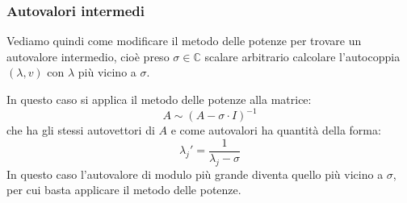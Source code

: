 \documentclass[a4paper,11pt]{article}
\begin{document}
\subsubsection{Autovalori intermedi}
Vediamo quindi come modificare il metodo delle potenze per trovare un autovalore intermedio, cioè preso $\sigma \in \mathbb{C}$ scalare arbitrario calcolare l'autocoppia $(\lambda, v)$ con $\lambda$ più vicino a $\sigma$.

In questo caso si applica il metodo delle potenze alla matrice:
$$
A \sim (A - \sigma \cdot I)^{-1}
$$
che ha gli stessi autovettori di $A$ e come autovalori ha quantità della forma:
$$
\lambda_j' = \frac{1}{\lambda_j - \sigma}
$$
In questo caso l'autovalore di modulo più grande diventa quello più vicino a $\sigma$, per cui basta applicare il metodo delle potenze.
\end{document}
